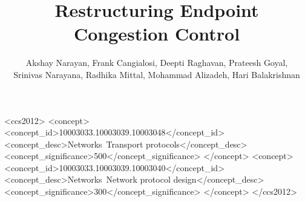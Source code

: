\documentclass[newfonts=false,format=sigconf,10pt,letterpaper,natbib=false]{acmart}
\begin{document}
\title{Restructuring Endpoint Congestion Control}
\author{
Akshay Narayan,
Frank Cangialosi,
Deepti Raghavan,
Prateesh Goyal,\\
Srinivas Narayana,
Radhika Mittal,
Mohammad Alizadeh,
Hari Balakrishnan
}
\begin{CCSXML}
<ccs2012>
<concept>
<concept_id>10003033.10003039.10003048</concept_id>
<concept_desc>Networks~Transport protocols</concept_desc>
<concept_significance>500</concept_significance>
</concept>
<concept>
<concept_id>10003033.10003039.10003040</concept_id>
<concept_desc>Networks~Network protocol design</concept_desc>
<concept_significance>300</concept_significance>
</concept>
</ccs2012>
\end{CCSXML}

\begin{sloppypar}

\maketitle












\end{sloppypar}
\end{document}

